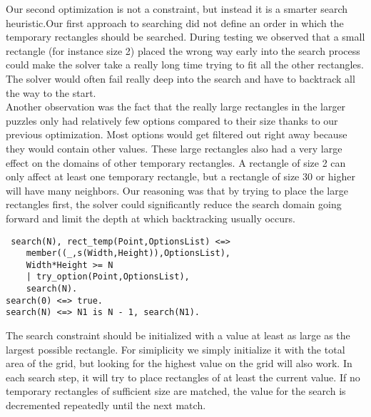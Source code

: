 Our second optimization is not a constraint, but instead it is a smarter search heuristic.Our first approach to searching did not define an order in which the temporary rectangles should be searched. During testing we observed that a small rectangle (for instance size 2) placed the wrong way early into the search process could make the solver take a really long time trying to fit all the other rectangles. The solver would often fail really deep into the search and have to backtrack all the way to the start. \\
 Another observation was the fact that the really large rectangles in the larger puzzles only had relatively few options compared to their size thanks to our previous optimization. Most options would get filtered out right away because they would contain other values. These large rectangles also had a very large effect on the domains of other temporary rectangles. A rectangle of size 2 can only affect at least one temporary rectangle, but a rectangle of size 30 or higher will have many neighbors. Our reasoning was that by trying to place the large rectangles first, the solver could significantly reduce the search domain going forward and limit the depth at which backtracking usually occurs.
 \begin{lstlisting}
 search(N), rect_temp(Point,OptionsList) <=>
	member((_,s(Width,Height)),OptionsList),
	Width*Height >= N
	| try_option(Point,OptionsList),
	search(N).
search(0) <=> true.
search(N) <=> N1 is N - 1, search(N1).
\end{lstlisting}
The search constraint should be initialized with a value at least as large as the largest possible rectangle. For simiplicity we simply initialize it with the total area of the grid, but looking for the highest value on the grid will also work. In each search step, it will try to place rectangles of at least the current value. If no temporary rectangles of sufficient size are matched, the value for the search is decremented repeatedly until the next match. \\

